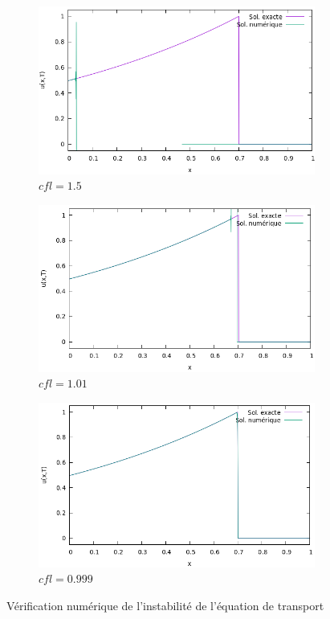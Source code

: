 \documentclass[
	french,
	11pt, %
]{fphw}
\begin{document}
\begin{figure}[H]
	\centering
	\begin{subfigure}[b]{0.45\textwidth}
		\centering
		\includegraphics[width=\textwidth]{TransportCFL15.png}
		\caption{$cfl=1.5$}
		\label{fig:TransportCFLa}
\end{subfigure}
	\begin{subfigure}[b]{0.45\textwidth}
		\centering
		\includegraphics[width=\textwidth]{TransportCFL101.png}
		\caption{$cfl=1.01$}
		\label{fig:TransportCFLb}
	\end{subfigure}
	\begin{subfigure}[b]{0.45\textwidth}
		\centering
		\includegraphics[width=\textwidth]{TransportCFL0999.png}
		\caption{$cfl=0.999$}
		\label{fig:TransportCFLc}
	\end{subfigure}
	\captionsetup{justification=centering}
	\caption{Vérification numérique de l'instabilité de l'équation de transport}
\end{figure}
\end{document}
